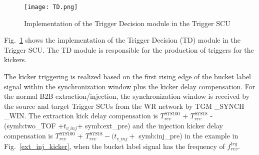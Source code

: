 %
 \begin{figure}[!htb]
   \centering   
   \texttt{[image: TD.png]}
   \caption{Implementation of the Trigger Decision module in the Trigger SCU}
   \label{TD}
\end{figure}
Fig.~\ref{TD} shows the implementation of the Trigger Decision (TD) module in the Trigger SCU.  The TD module is responsible for the production of triggers for the kickers. 

The kicker triggering is realized based on the first rising edge of the bucket label signal within the synchronization window plus the kicker delay compensation. For the normal B2B extraction/injection, the synchronization window is received by the source and target Trigger SCUs from the WR network by TGM \_SYNCH \_WIN. The extraction kick delay compensation is $T_{\mathit{rev}}^{\mathit{SIS100}}$ + $T_{\mathit{rev}}^{\mathit{SIS18}}$ -(\gls{symb:two_TOF} +$ t_{v\_inj}$+ \gls{symb:ext_pre}) and the injection kicker delay compensation is $T_{\mathit{rev}}^{\mathit{SIS100}}$ + $T_{\mathit{rev}}^{\mathit{SIS18}} - (t_{v\_inj}+$ \gls{symb:inj_pre}) in the example in Fig.~\ref{ext_inj_kicker}, when the bucket label signal has the frequency of $f_{\mathit{rev}}^{\mathit{trg}}$. 

